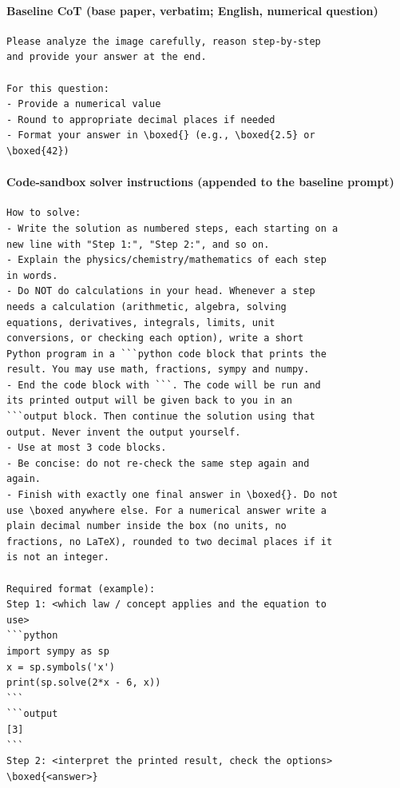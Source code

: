 \paragraph{Baseline CoT (base paper, verbatim; English, numerical question)}
\begin{scriptsize}\begin{verbatim}
Please analyze the image carefully, reason step-by-step
and provide your answer at the end.

For this question:
- Provide a numerical value
- Round to appropriate decimal places if needed
- Format your answer in \boxed{} (e.g., \boxed{2.5} or
\boxed{42})
\end{verbatim}\end{scriptsize}

\paragraph{Code-sandbox solver instructions (appended to the baseline prompt)}
\begin{scriptsize}\begin{verbatim}
How to solve:
- Write the solution as numbered steps, each starting on a
new line with "Step 1:", "Step 2:", and so on.
- Explain the physics/chemistry/mathematics of each step
in words.
- Do NOT do calculations in your head. Whenever a step
needs a calculation (arithmetic, algebra, solving
equations, derivatives, integrals, limits, unit
conversions, or checking each option), write a short
Python program in a ```python code block that prints the
result. You may use math, fractions, sympy and numpy.
- End the code block with ```. The code will be run and
its printed output will be given back to you in an
```output block. Then continue the solution using that
output. Never invent the output yourself.
- Use at most 3 code blocks.
- Be concise: do not re-check the same step again and
again.
- Finish with exactly one final answer in \boxed{}. Do not
use \boxed anywhere else. For a numerical answer write a
plain decimal number inside the box (no units, no
fractions, no LaTeX), rounded to two decimal places if it
is not an integer.

Required format (example):
Step 1: <which law / concept applies and the equation to
use>
```python
import sympy as sp
x = sp.symbols('x')
print(sp.solve(2*x - 6, x))
```
```output
[3]
```
Step 2: <interpret the printed result, check the options>
\boxed{<answer>}
\end{verbatim}\end{scriptsize}

